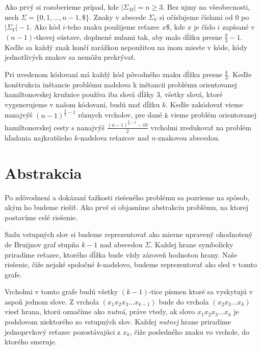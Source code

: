 Ako prvý si rozoberieme prípad, kde $|\Sigma_M| = n \ge 3$. Bez ujmy na všeobecnosti,
nech $\Sigma = \{0, 1, \ldots, n-1, \$ \}$. Znaky v abecede $\Sigma_V$ si očíslujeme
číslami od $0$ po $|\Sigma_V| - 1$. Ako kód $i$-teho znaku použijeme reťazec
$x \$ $, kde $x$ je číslo $i$ zapísané v $(n-1)$-tkovej sústave, doplnené nulami tak,
aby malo dĺžku presne $\frac{k}{3} - 1$. Keďže sa každý znak končí zarážkou nepoužitou na
inom mieste v kóde, kódy jednotlivých znakov sa nemôžu prekrývať.

Pri uvedenom kódovaní má každý kód pôvodného znaku dĺžku presne $\frac{k}{3}$. Keďže
konštrukcia inštancie problému nadslova k inštancii problému orientovanej hamiltonovskej
kružnice používa iba slová dĺžky $3$, všetky slová, ktoré vygenerujeme v našom kódovaní,
budú mať dĺžku $k$. Keďže zakódovať vieme nanajvýš $(n-1)^{\frac{k}{3} - 1}$ rôznych
vrcholov, pre dané $k$ vieme problém orientovanej hamiltonovskej cesty s nanajvýš
$\frac{(n-1)^{\frac{k}{3}-1} - 10}{2}$ vrcholmi zredukovať na problém hľadania
najkratšieho $k$-nadslova reťazcov nad $n$-znakovou abecedou.

\section{Abstrakcia}

Po zdôvodnení a dokázaní ťažkosti riešeného problému sa pozrieme na spôsob, akým ho budeme
riešiť. Ako prvé si objasníme abstrakciu problému, na ktorej postavíme celé riešenie.

Sadu vstupných slov si budeme reprezentovať ako mierne upravený ohodnotený de Bruijnov graf stupňa $k - 1$ nad
abecedou $\Sigma$. Každej hrane symbolicky priradíme reťazec, ktorého dĺžka bude
vždy zároveň hodnotou hrany.
Naše riešenie, čiže nejaké spoločné $k$-nadslovo, budeme reprezentovať ako sled v tomto grafe.

Vrcholmi v tomto grafe budú všetky $(k - 1)$-tice písmen ktoré sa vyskytujú v aspoň jednom slove.
Z vrchola $\left(x_1 x_2 x_3 \ldots x_{k-1}\right)$ bude do vrchola $\left(x_2 x_3 \ldots x_k\right)$
viesť hrana, ktorú označíme ako \emph{nutnú},
práve vtedy, ak slovo $x_1 x_2 x_3 \ldots x_k$ je podslovom niektorého zo
vstupných slov. Každej \emph{nutnej} hrane priradíme jednoprvkový reťazec pozostávajúci z $x_k$, čiže
posledného znaku vo vrchole, do ktorého smeruje.

